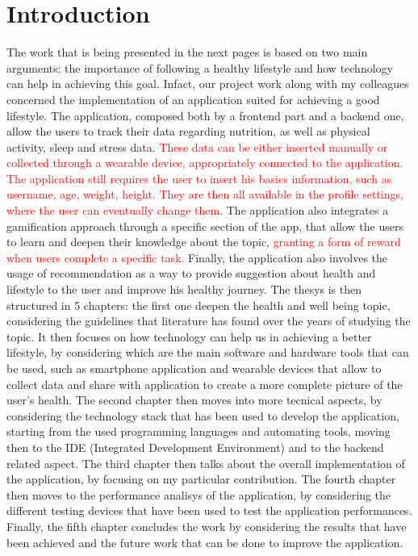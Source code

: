 \section*{Introduction}
The work that is being presented in the next pages is based on two main arguments: the importance of following a healthy lifestyle and how technology can help in achieving this goal. Infact, our project work along with my colleagues concerned the implementation of an application suited for achieving a good lifestyle. The application, composed both by a frontend part and a backend one, allow the users to track their data regarding nutrition, as well as physical activity, sleep and stress data. \textcolor{red}{These data can be either inserted manually or collected through a wearable device, appropriately connected to the application. The application still requires the user to insert his basics information, such as username, age, weight, height. They are then all available in the profile settings, where the user can eventually change them}. The application also integrates a gamification approach through a specific section of the app, that allow the users to learn and deepen their knowledge about the topic, \textcolor{red}{granting a form of reward when users complete a specific task.} Finally, the application also involves the usage of recommendation as a way to provide suggestion about health and lifestyle to the user and improve his healthy journey. The thesys is then structured in 5 chapters: the first one deepen the health and well being topic, considering the guidelines that literature has found over the years of studying the topic. It then focuses on how technology can help us in achieving a better lifestyle, by considering which are the main software and hardware tools that can be used, such as smartphone application and wearable devices that allow to collect data and share with application to create a more complete picture of the user's health. The second chapter then moves into more tecnical aspects, by considering the technology stack that has been used to develop the application, starting from the used programming languages and automating tools, moving then to the IDE (Integrated Development Environment) and to the backend related aspect. The third chapter then talks about the overall implementation of the application, by focusing on my particular contribution. The fourth chapter then moves to the performance analisys of the application, by considering the different testing devices that have been used to test the application performances. Finally, the fifth chapter concludes the work by considering the results that have been achieved and the future work that can be done to improve the application.
\newpage